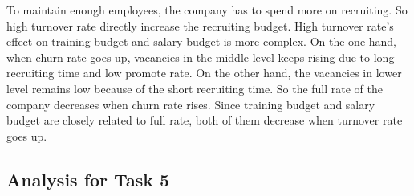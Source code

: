 \documentclass[12pt,a4paper,titlepage]{article}
\begin{document}
To maintain enough employees, the company has to spend more on recruiting. So high turnover rate directly increase the recruiting budget. High turnover rate's effect on training budget and salary budget is more complex. On the one hand, when churn rate goes up, vacancies in the middle level keeps rising due to long recruiting time and low promote rate. On the other hand, the vacancies in lower level remains low because of the short recruiting time. So the full rate of the company decreases when churn rate rises. Since training budget and salary budget are closely related to full rate, both of them decrease when turnover rate goes up.
\subsection{Analysis for Task 5}
\label{sec:analysis-for-task-5}
\end{document}
